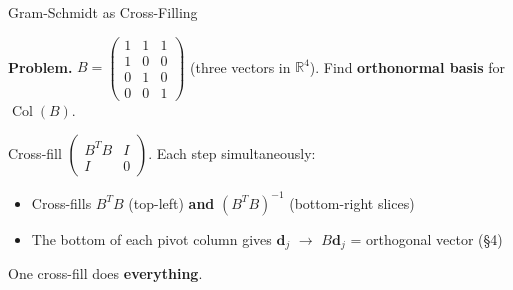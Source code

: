 \documentclass[10pt]{beamer}
\theoremstyle{definition}
\newcommand{\x}[1]{\alert{\textbf{#1}}}
\begin{document}
\begin{frame}{Gram-Schmidt as Cross-Filling}

\textbf{Problem.} \; $B = \begin{pmatrix} 1 & 1 & 1 \\ 1 & 0 & 0 \\ 0 & 1 & 0 \\ 0 & 0 & 1 \end{pmatrix}$ \; (three vectors in $\mathbb{R}^4$). Find \x{orthonormal basis} for $\operatorname{Col}(B)$.

\vspace{0.5em}

Cross-fill $\begin{pmatrix} B^TB & I \\ I & 0 \end{pmatrix}$. Each step simultaneously:

\vspace{0.2em}

\begin{itemize}
\item Cross-fills $B^TB$ (top-left) \x{and} $(B^TB)^{-1}$ (bottom-right slices)
\item The bottom of each pivot column gives $\mathbf{d}_j$ $\to$ $B\mathbf{d}_j$ = orthogonal vector (\S4)
\end{itemize}

\vspace{0.3em}

One cross-fill does \x{everything}.

\end{frame}
\end{document}
